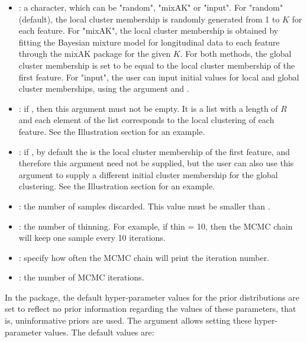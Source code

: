 \begin{itemize}
	 \item  {}: a character, which can be "random", "mixAK" or "input". For "random" (default), the local cluster membership is randomly generated from 1 to $K$ for each feature.  For "mixAK", the local cluster membership is obtained by fitting the Bayesian mixture model for longitudinal data to each feature through the mixAK package for the given $K$.  For both methods, the global cluster membership is set to be equal to the local cluster membership of the first feature. For "input", the user can input initial values for local and global cluster memberships, using the argument  and . 

	\item  {}: if  , then this argument must not be empty. It is a list with a length of $R$ and each element of the list corresponds to the local clustering of each feature. See the Illustration section for an example.

	\item  {}: if  , by default the  is the local cluster membership of the first feature, and therefore this argument need not be supplied, but the user can also use this argument to supply a different initial cluster membership for the global clustering. See the Illustration section for an example.

	\item  {}: the number of samples discarded. This value must be smaller than .

	\item  {}: the number of thinning. For example, if thin = 10, then the MCMC chain will keep one sample every 10 iterations. 

	\item  {}: specify how often the MCMC chain will print the iteration number. 

	\item  {}: the number of MCMC iterations. 

\end{itemize}

In the  package, the default hyper-parameter values for the prior distributions are set to reflect no prior information regarding the values of these parameters, that is, uninformative priors are used. The argument  allows setting these hyper-parameter values. The default values are: 

